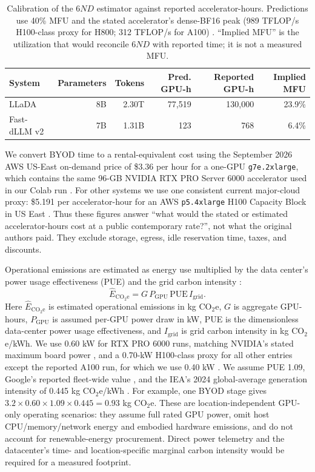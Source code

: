 \documentclass{article}
\begin{document}
\begin{table}[h]
\caption{Calibration of the $6ND$ estimator against reported accelerator-hours. Predictions use 40\% MFU and the stated accelerator's dense-BF16 peak (989 TFLOP/s H100-class proxy for H800; 312 TFLOP/s for A100) \citep{nvidiaH100,nvidiaA100}. ``Implied MFU'' is the utilization that would reconcile $6ND$ with reported time; it is not a measured MFU.}
\label{tab:compute-calibration}
\centering
\small
\begin{tabular}{lrrrrr}
\toprule
System & Parameters & Tokens & Pred. GPU-h & Reported GPU-h & Implied MFU \\
\midrule
LLaDA & 8B & 2.30T & 77,519 & 130,000 & 23.9\% \\
Fast-dLLM v2 & 7B & 1.31B & 123 & 768 & 6.4\% \\
\bottomrule
\end{tabular}
\end{table}

We convert BYOD time to a rental-equivalent cost using the September 2026 AWS US-East on-demand price of \$3.36 per hour for a one-GPU \texttt{g7e.2xlarge}, which contains the same 96-GB NVIDIA RTX PRO Server 6000 accelerator used in our Colab run \citep{awsG7e2026}. For other systems we use one consistent current major-cloud proxy: \$5.191 per accelerator-hour for an AWS \texttt{p5.4xlarge} H100 Capacity Block in US East \citep{awsCapacity2026}. Thus these figures answer ``what would the stated or estimated accelerator-hours cost at a public contemporary rate?'', not what the original authors paid. They exclude storage, egress, idle reservation time, taxes, and discounts.

Operational emissions are estimated as energy use multiplied by the data center's power usage effectiveness (PUE) and the grid carbon intensity \citep{lannelongue2021green,patterson2021carbon}:
\begin{equation}
\widehat{E}_{\mathrm{CO_2e}}=G\,P_{\mathrm{GPU}}\,\mathrm{PUE}\,I_{\mathrm{grid}}.
\end{equation}
Here $\widehat{E}_{\mathrm{CO_2e}}$ is estimated operational emissions in kg CO$_2$e, $G$ is aggregate GPU-hours, $P_{\mathrm{GPU}}$ is assumed per-GPU power draw in kW, PUE is the dimensionless data-center power usage effectiveness, and $I_{\mathrm{grid}}$ is grid carbon intensity in kg CO$_2$e/kWh. We use 0.60 kW for RTX PRO 6000 runs, matching NVIDIA's stated maximum board power \citep{nvidiaRTXPro6000}, and a 0.70-kW H100-class proxy for all other entries except the reported A100 run, for which we use 0.40 kW \citep{nvidiaH100,nvidiaA100}. We assume PUE 1.09, Google's reported fleet-wide value \citep{googlePUE2025}, and the IEA's 2024 global-average generation intensity of 0.445 kg CO$_2$e/kWh \citep{ieaElectricity2025}. For example, one BYOD stage gives $3.2\times0.60\times1.09\times0.445=0.93$ kg CO$_2$e. These are location-independent GPU-only operating scenarios: they assume full rated GPU power, omit host CPU/memory/network energy and embodied hardware emissions, and do not account for renewable-energy procurement. Direct power telemetry and the datacenter's time- and location-specific marginal carbon intensity would be required for a measured footprint.
\end{document}
